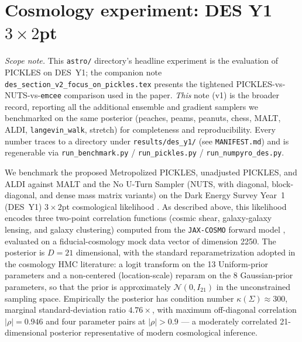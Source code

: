 \documentclass{article}
\newcommand{\gN}{\mathcal{N}}
\begin{document}
\section{Cosmology experiment: DES Y1 \texorpdfstring{$3\times 2$pt}{3x2pt}}\label{sec:desY1}

\emph{Scope note.} This \texttt{astro/} directory's headline experiment
is the evaluation of PICKLES on DES~Y1; the companion note
\texttt{des\_section\_v2\_focus\_on\_pickles.tex} presents the tightened
PICKLES-vs-NUTS-vs-\texttt{emcee} comparison used in the paper.
\emph{This} note (v1) is the broader record, reporting all the additional
ensemble and gradient samplers we benchmarked on the same posterior
(peaches, peams, peanuts, chess, MALT, ALDI, \texttt{langevin\_walk},
stretch) for completeness and reproducibility. Every number traces to a
directory under \texttt{results/des\_y1/} (see \texttt{MANIFEST.md}) and
is regenerable via \texttt{run\_benchmark.py} / \texttt{run\_pickles.py} /
\texttt{run\_numpyro\_des.py}.

We benchmark the proposed Metropolized PICKLES, unadjusted PICKLES, and
ALDI against MALT and the No U-Turn Sampler (NUTS, with diagonal,
block-diagonal, and dense mass matrix variants) on the Dark Energy
Survey Year~1 (DES~Y1) $3\times 2$pt cosmological likelihood
\cite{abbott2018dark,krause2017dark}. As described above, this
likelihood encodes three two-point correlation functions (cosmic shear,
galaxy-galaxy lensing, and galaxy clustering) computed from the
\texttt{JAX-COSMO} forward model \cite{campagne2023jax}, evaluated on a
fiducial-cosmology mock data vector of dimension 2250.
The posterior is $D=21$ dimensional, with the standard reparametrization
adopted in the cosmology HMC literature: a logit transform on the 13
Uniform-prior parameters and a non-centered (location-scale) reparam on
the 8 Gaussian-prior parameters, so that the prior is approximately
$\gN(0,I_{21})$ in the unconstrained sampling space. Empirically the
posterior has condition number $\kappa(\Sigma)\approx 300$, marginal
standard-deviation ratio $4.76\times$, with maximum off-diagonal
correlation $|\rho|=0.946$ and four parameter pairs at $|\rho|>0.9$ —
a moderately correlated 21-dimensional posterior representative of
modern cosmological inference.
\end{document}
